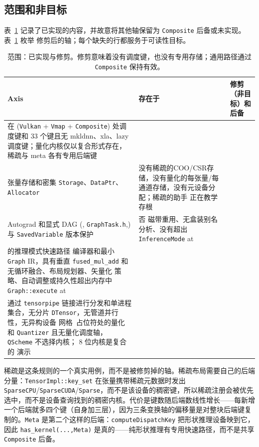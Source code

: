 \subsection{范围和非目标}
\label{sec:intro:scope}

表~\ref{tab:intro:scope} 记录了已实现的内容，并故意将其他轴保留为 \texttt{Composite} 后备或未实现。表~\ref{tab:intro:scope} 枚举
修剪后的轴；每个缺失的行都服务于可读性目标。

\begin{table}[H]
\centering
\caption{范围：已实现与修剪。修剪意味着没有调度键，也没有专用存储；通用路径通过 \texttt{Composite} 保持有效。}
\label{tab:intro:scope}
\small
\begin{tabular}{p{2.8cm}p{4.6cm}p{4.6cm}}
\toprule
Axis & 存在于 & 修剪（非目标）和后备 \\
\midrule
在 (\texttt{Vulkan} + \texttt{Vmap} + \texttt{Composite}) 处调度键和 33 个键且无 mkldnn、xla、lazy
调度键；量化内核仅以复合形式存在，稀疏与 meta 各有专用后端键 \\
张量存储和密集 \texttt{Storage}、\texttt{DataPtr}、\texttt{Allocator}
 &没有稀疏的COO/CSR存储，没有量化的每张量/每通道存储，没有元设备分配；稀疏的助手
正在教学存根 \\
Autograd 和显式 DAG (, \texttt{GraphTask.h},) 与 \texttt{SavedVariable} 版本保护 & 否
磁带重用、无盒装别名分析、没有超出 \texttt{InferenceMode} at \\ 的推理模式快速路径
编译器和最小 \texttt{Graph} IR，具有垂直 \texttt{fused\_mul\_add} 和无循环融合、布局规划器、矢量化
策略、自动调整或持久性超出内存中 \texttt{Graph::execute} at \\
通过 \texttt{tensorpipe} 链接进行分发和单进程集合，无分片 \texttt{DTensor}，无管道并行性，无异构设备
网格\
占位符处的量化和 \texttt{Quantizer} 且无量化调度轴，\texttt{QScheme} 不选择内核； 8 位内核是复合的
演示 \\
\bottomrule
\end{tabular}
\end{table}

稀疏是这条规则的一个真实用例，而不是被修剪掉的轴。稀疏布局需要自己的后端分量：\texttt{TensorImpl::key\_set} 在张量携带稀疏元数据时发出 \texttt{SparseCPU}/\texttt{SparseCUDA}/\texttt{Sparse}，而不是该设备的稠密键，所以稀疏注册会被优先选中，而不是设备查询找到的稠密内核。代价是键数随后端数线性增长——每新增一个后端就多四个键（自身加三层），因为三条变换轴的偏移量是对整块后端键复制的。\texttt{Meta} 是第二个这样的后端：\texttt{computeDispatchKey} 把形状推理设备映到它，因此 \texttt{has\_kernel(...,Meta)} 是真的——纯形状推理有专用快速路径，而不是共享 \texttt{Composite} 后备。

